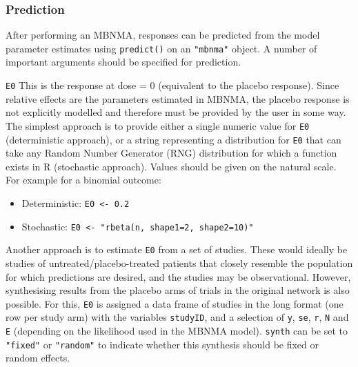 \documentclass[]{article}
\newenvironment{Shaded}{\begin{snugshade}}{\end{snugshade}}
\newcommand{\DecValTok}[1]{\textcolor[rgb]{0.00,0.00,0.81}{#1}}
\newcommand{\NormalTok}[1]{#1}
\newcommand{\OperatorTok}[1]{\textcolor[rgb]{0.81,0.36,0.00}{\textbf{#1}}}
\newcommand{\StringTok}[1]{\textcolor[rgb]{0.31,0.60,0.02}{#1}}
\providecommand{\tightlist}{%
  \setlength{\itemsep}{0pt}\setlength{\parskip}{0pt}}
\begin{document}
\hypertarget{prediction}{%
\subsubsection{Prediction}\label{prediction}}

After performing an MBNMA, responses can be predicted from the model
parameter estimates using \texttt{predict()} on an \texttt{"mbnma"}
object. A number of important arguments should be specified for
prediction.

\texttt{E0} This is the response at dose = 0 (equivalent to the placebo
response). Since relative effects are the parameters estimated in MBNMA,
the placebo response is not explicitly modelled and therefore must be
provided by the user in some way. The simplest approach is to provide
either a single numeric value for \texttt{E0} (deterministic approach),
or a string representing a distribution for \texttt{E0} that can take
any Random Number Generator (RNG) distribution for which a function
exists in R (stochastic approach). Values should be given on the natural
scale. For example for a binomial outcome:

\begin{itemize}
\tightlist
\item
  Deterministic: \texttt{E0\ \textless{}-\ 0.2}
\item
  Stochastic:
  \texttt{E0\ \textless{}-\ "rbeta(n,\ shape1=2,\ shape2=10)"}
\end{itemize}

Another approach is to estimate \texttt{E0} from a set of studies. These
would ideally be studies of untreated/placebo-treated patients that
closely resemble the population for which predictions are desired, and
the studies may be observational. However, synthesising results from the
placebo arms of trials in the original network is also possible. For
this, \texttt{E0} is assigned a data frame of studies in the long format
(one row per study arm) with the variables \texttt{studyID}, and a
selection of \texttt{y}, \texttt{se}, \texttt{r}, \texttt{N} and
\texttt{E} (depending on the likelihood used in the MBNMA model).
\texttt{synth} can be set to \texttt{"fixed"} or \texttt{"random"} to
indicate whether this synthesis should be fixed or random effects.

\begin{Shaded}
\end{Shaded}
\end{document}
